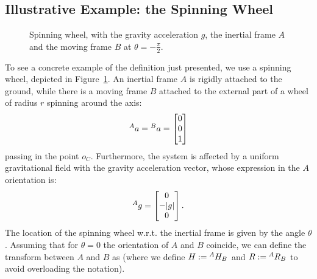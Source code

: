\subsection{Illustrative Example: the Spinning Wheel}
\begin{figure}
\caption{Spinning wheel, with the gravity acceleration $g$, the inertial frame $A$ and the moving frame $B$ at $\theta = -\frac{\pi}{2}$.}
\label{fig:spinningWheel}
\end{figure}


To see a concrete example of the definition just presented, we use a spinning wheel, depicted in Figure~\ref{fig:spinningWheel}. An inertial frame $A$ is rigidly attached to the ground, while there is a moving frame $B$ attached to the external part of a wheel of radius $r$ spinning around the axis:
$$\hspace{0em}^A a = \hspace{0em}^B a =  \begin{bmatrix} 0 \\ 0 \\ 1 \end{bmatrix}$$
passing in the point $o_C$. Furthermore, the system is affected by a uniform gravitational field with the gravity acceleration vector, whose expression in the $A$ orientation is:
$$\hspace{0em}^A g = \begin{bmatrix} 0 \\ - |g| \\ 0 \end{bmatrix}.$$ 
The location of the spinning wheel w.r.t. the inertial frame is given by the angle $\theta$. Assuming that for $\theta = 0$ the orientation of $A$ and $B$ coincide, we can define the transform between $A$ and $B$ as (where we define $H := \hspace{0em}^A H_B$ and $R := \hspace{0em}^A R_B$ to avoid overloading the notation).


